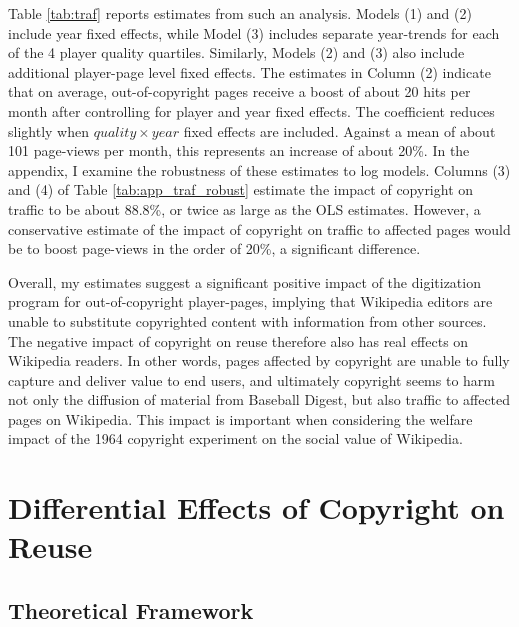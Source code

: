 \documentclass[11pt]{article}
\begin{document}
Table \ref{tab:traf} reports estimates from such an analysis. Models (1) and (2) include year fixed effects, while Model (3) includes separate year-trends for each of the 4 player quality quartiles. Similarly, Models (2) and (3) also include additional player-page level fixed effects. The estimates in Column (2) indicate that on average, out-of-copyright pages receive a boost of about 20 hits per month after controlling for player and year fixed effects. The coefficient reduces slightly when \emph{$quality \times year$} fixed effects are included. Against a mean of about 101 page-views per month, this represents an increase of about 20\%. In the appendix, I examine the robustness of these estimates to log models. Columns (3) and (4) of Table \ref{tab:app_traf_robust} estimate the impact of copyright on traffic to be about 88.8\%, or twice as large as the OLS estimates. However, a conservative estimate of the impact of copyright on traffic to affected pages would be to boost page-views in the order of 20\%, a significant difference.

Overall, my estimates suggest a significant positive impact of the digitization program for out-of-copyright player-pages, implying that Wikipedia editors are unable to substitute copyrighted content with information from other sources. The negative impact of copyright on reuse therefore also has real effects on Wikipedia readers. In other words, pages affected by copyright are unable to fully capture and deliver value to end users, and ultimately copyright seems to harm not only the diffusion of material from Baseball Digest, but also traffic to affected pages on Wikipedia. This impact is important when considering the welfare impact of the 1964 copyright experiment on the social value of Wikipedia. 

\section{Differential Effects of Copyright on Reuse}
\label{sec:hetero}

\subsection{Theoretical Framework}
\end{document}
